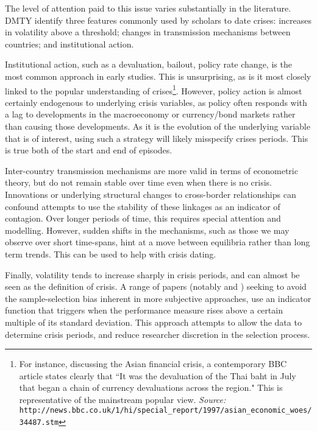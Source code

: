 \documentclass[../base.tex]{subfiles}
\begin{document}
The level of attention paid to this issue varies substantially in the literature. DMTY identify three  features commonly used by scholars to date crises: increases in volatility above a threshold; changes in transmission mechanisms between countries; and institutional action.

Institutional action, such as a devaluation, bailout, policy rate change, is the most common approach in early studies. This is unsurprising, as is it most closely linked to the popular understanding of crises\footnote{For instance, discussing the Asian financial crisis, a contemporary BBC article states clearly that ``It was the devaluation of the Thai baht in July that began a chain of currency devaluations across the region." This is representative of the mainstream popular view.
	\textit{Source:} \texttt{http://news.bbc.co.uk/1/hi/special\_report/1997/asian\_economic\_woes/34487.stm}}. However, policy action is almost certainly endogenous to underlying crisis variables, as policy often responds with a lag to developments in the macroeconomy or currency/bond markets rather than causing those developments. As it is the evolution of the underlying variable that is of interest, using such a strategy will likely misspecify crises periods. This is true both of the start and end of episodes. 

Inter-country transmission mechanisms are more valid in terms of econometric theory, but do not remain stable over time even when there is no crisis. Innovations or underlying structural changes to cross-border relationships can confound attempts to use the stability of these linkages as an indicator of contagion. Over longer periods of time, this requires special attention and modelling. However, sudden shifts in the mechanisms, such as those we may observe over short time-spans, hint at a move between equilibria rather than long term trends. This can be used to help with crisis dating.

Finally, volatility tends to increase sharply in crisis periods, and can almost be seen as the definition of crisis. A range of papers (notably \cite{eichengreen1996contagious} and \cite{pesaran2007econometric}) seeking to avoid the sample-selection bias inherent in more subjective approaches, use an indicator function that triggers when the performance measure rises above a certain multiple of its standard deviation. This approach attempts to allow the data to determine crisis periods, and reduce researcher discretion in the selection process.
\end{document}
